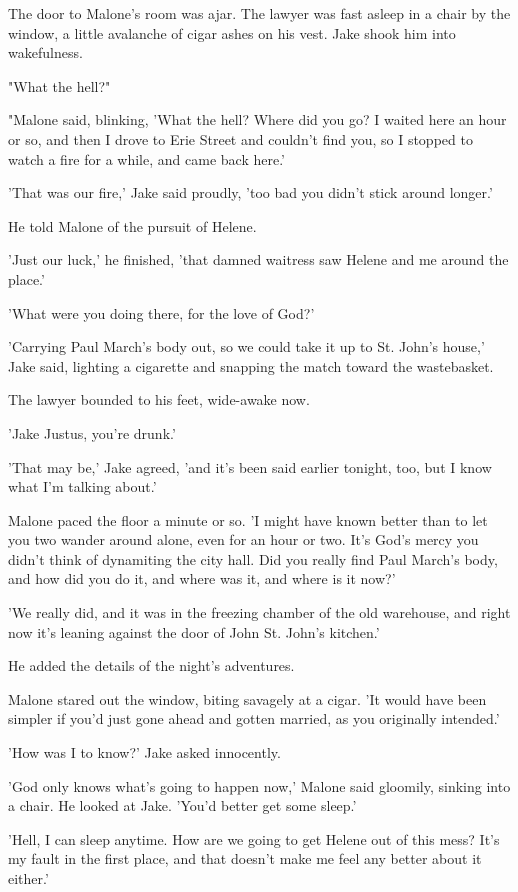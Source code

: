 \documentclass{novel}
\begin{document}
The door to Malone’s room was ajar. The lawyer was fast asleep in a chair by the window, a little avalanche of cigar ashes on his vest. Jake shook him into wakefulness.

"What the hell?"

"Malone said, blinking, 'What the hell? Where did you go? I waited here an hour or so, and then I drove to Erie Street and couldn’t find you, so I stopped to watch a fire for a while, and came back here.'

'That was our fire,' Jake said proudly, 'too bad you didn’t stick around longer.'

He told Malone of the pursuit of Helene.

'Just our luck,' he finished, 'that damned waitress saw Helene and me around the place.'

'What were you doing there, for the love of God?'

'Carrying Paul March’s body out, so we could take it up to St. John’s house,' Jake said, lighting a cigarette and snapping the match toward the wastebasket.

The lawyer bounded to his feet, wide-awake now.

'Jake Justus, you’re drunk.'

'That may be,' Jake agreed, 'and it’s been said earlier tonight, too, but I know what I’m talking about.'

Malone paced the floor a minute or so. 'I might have known better than to let you two wander around alone, even for an hour or two. It’s God’s mercy you didn’t think of dynamiting the city hall. Did you really find Paul March’s body, and how did you do it, and where was it, and where is it now?'

'We really did, and it was in the freezing chamber of the old warehouse, and right now it’s leaning against the door of John St. John’s kitchen.'

He added the details of the night’s adventures.

Malone stared out the window, biting savagely at a cigar. 'It would have been simpler if you’d just gone ahead and gotten married, as you originally intended.'

'How was I to know?' Jake asked innocently.

'God only knows what’s going to happen now,' Malone said gloomily, sinking into a chair. He looked at Jake. 'You’d better get some sleep.'

'Hell, I can sleep anytime. How are we going to get Helene out of this mess? It’s my fault in the first place, and that doesn’t make me feel any better about it either.'
\end{document}
